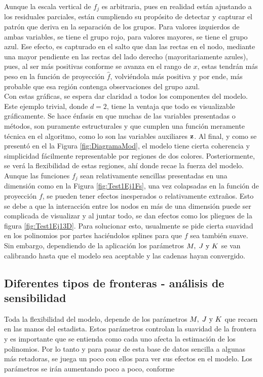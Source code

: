 \documentclass[../Main/Main.tex]{subfiles}
\begin{document}
Aunque la escala vertical de $f_j$ es arbitraria, pues en realidad  están ajustando a los residuales parciales, están cumpliendo su propósito de detectar y capturar el patrón que deriva en la separación de los grupos. Para valores izquierdos de ambas variables, se tiene el grupo rojo, para valores mayores, se tiene el grupo azul. Ese efecto, es capturado en el salto que dan las rectas en el nodo, mediante una mayor pendiente en las rectas del lado derecho (mayoritariamente azules), pues, al ser más positivas conforme se avanza en el rango de $x$, estas tendrán más peso en la función de proyección $\hat{f}$, volviéndola más positiva y por ende, más probable que esa región contenga observaciones del grupo azul.\\

Con estas gráficas, se espera dar claridad a todos los componentes del modelo. Este ejemplo trivial, donde $d = 2$, tiene la ventaja que todo es visualizable gráficamente. Se hace énfasis en que muchas de las variables presentadas o métodos, son puramente estructurales y que cumplen una función meramente técnica en el algoritmo, como lo son las variables auxiliares $\mathbf{z}$. Al final, y como se presentó en el la Figura \ref{fig:DiagramaMod}, el modelo tiene cierta coherencia y simplicidad fácilmente representable por regiones de dos colores. Posteriormente, se verá la flexibilidad de estas regiones, ahí donde recae la fuerza del modelo.\\

Aunque las funciones $f_j$ sean relativamente sencillas presentadas en una dimensión como en la Figura \ref{fig:Test1Ej1Fs}, una vez colapsadas en la función de proyección $f$, se pueden tener efectos inesperados o relativamente extraños. Esto se debe a que la interacción entre los nodos en más de una dimensión puede ser complicada de visualizar y al juntar todo, se dan efectos como los pliegues de la figura \ref{fig:Test1Ej13D}. Para solucionar esto, usualmente se pide cierta suavidad en los polinomios por partes haciéndolos splines para que $f$ sea también suave. Sin embargo, dependiendo de la aplicación los parámetros $M,\;J\text{ y }K$ se van calibrando hasta que el modelo sea aceptable y las cadenas hayan convergido.\\ 

\subsection{Diferentes tipos de fronteras - análisis de sensibilidad }
Toda la flexibilidad del modelo, depende de los parámetros $M,\;J\text{ y }K$ que recaen en las manos del estadista. Estos parámetros controlan la suavidad de la frontera y es importante que se entienda como cada uno afecta la estimación de los polinomios. Por lo tanto y para pasar de esta base de datos sencilla a algunas más retadoras, se juega un poco con ellos para ver sus efectos en el modelo. Los parámetros se irán aumentando poco a poco, conforme\\
\end{document}
